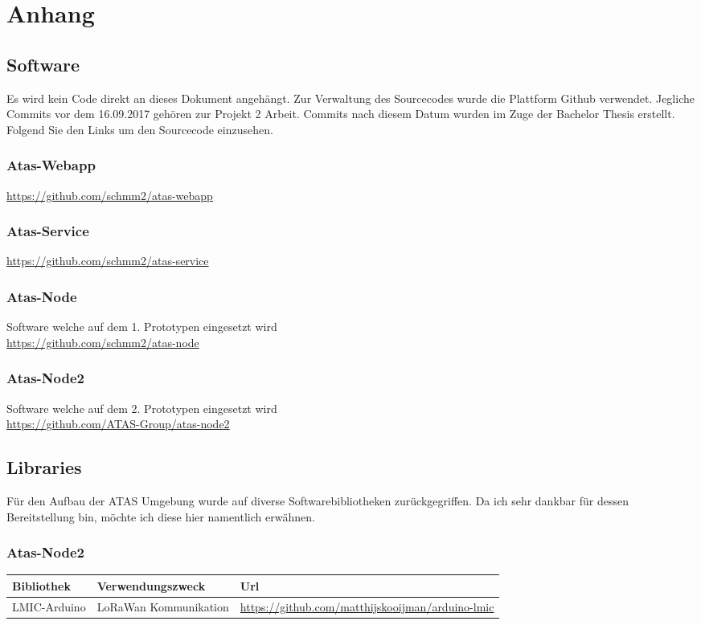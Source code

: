 \documentclass[11pt,english,german]{report}
\theoremstyle{definition}
\begin{document}
\chapter*{Anhang}
\section{Software}
Es wird kein Code direkt an dieses Dokument angehängt. Zur Verwaltung des Sourcecodes wurde die Plattform Github verwendet. Jegliche Commits vor dem 16.09.2017 gehören zur Projekt 2 Arbeit. Commits nach diesem Datum wurden im Zuge der Bachelor Thesis erstellt. 
Folgend Sie den Links um den Sourcecode einzusehen.
\subsection{Atas-Webapp}
\url{https://github.com/schmm2/atas-webapp}
\subsection{Atas-Service}
\url{https://github.com/schmm2/atas-service}
\subsection{Atas-Node}
Software welche auf dem 1. Prototypen eingesetzt wird\\
\url{https://github.com/schmm2/atas-node}
\subsection{Atas-Node2}
Software welche auf dem 2. Prototypen eingesetzt wird\\
\url{https://github.com/ATAS-Group/atas-node2}

\newpage
\section{Libraries}
Für den Aufbau der ATAS Umgebung wurde auf diverse Softwarebibliotheken zurückgegriffen. Da ich sehr dankbar für dessen Bereitstellung bin, möchte ich diese hier namentlich erwähnen.

\subsection{Atas-Node2}
\begin{tabularx}{\linewidth}{XXX}
	\textbf{Bibliothek} & \textbf{Verwendungszweck} & \textbf{Url} \\ \hline
	LMIC-Arduino & LoRaWan Kommunikation & \url{https://github.com/matthijskooijman/arduino-lmic}\\ \hline
\end{tabularx} 
\end{document}
